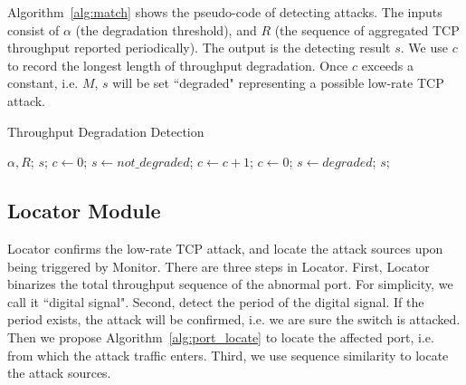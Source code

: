 

Algorithm~\ref{alg:match} shows the pseudo-code of detecting attacks. The inputs consist of $\alpha$ (the degradation threshold), and $R$ (the sequence of aggregated TCP throughput reported periodically). The output is the detecting result $s$. We use $c$ to record the longest length of throughput degradation. Once $c$ exceeds a constant, i.e. $M$, $s$ will be set ``degraded" representing a possible low-rate TCP attack. 
\begin{algorithm}[H]
  \caption{Throughput Degradation Detection}
  \label{alg:match}
  \begin{algorithmic}[1]
  \REQUIRE $\alpha, R$;
  \ENSURE $s$;
  \STATE $c \gets 0$;
  \STATE $s \gets not\_degraded$;
        \STATE $c \gets c + 1$;
    \ELSE 
        \STATE $c \gets 0$;
    \ENDIF
        \STATE $s \gets degraded$;
    \ENDIF
  \ENDFOR
  \RETURN $s$;
  \end{algorithmic}
\end{algorithm}


\subsection{Locator Module}

Locator confirms the low-rate TCP attack, and locate the attack sources upon being triggered by Monitor. There are three steps in Locator. First, Locator binarizes the total throughput sequence of the abnormal port. For simplicity, we call it ``digital signal". Second, detect the period of the digital signal. If the period exists, the attack will be confirmed, i.e. we are sure the switch is attacked. Then we propose Algorithm~\ref{alg:port_locate} to locate the affected port, i.e. from which the attack traffic enters. Third, we use sequence similarity to locate the attack sources. 

